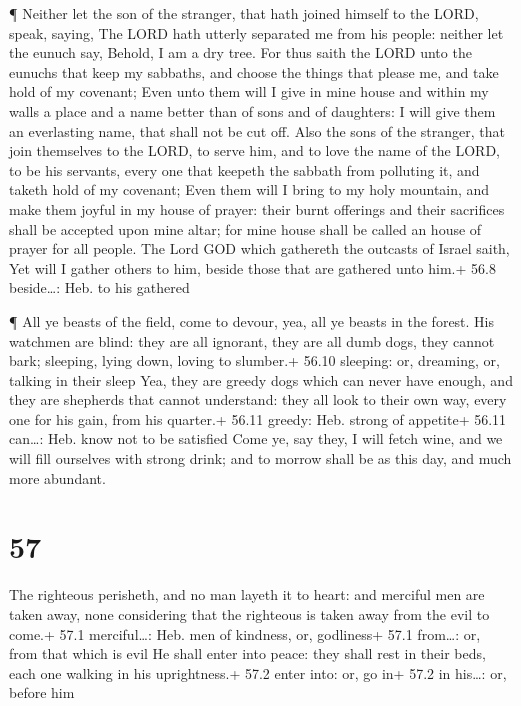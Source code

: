  ¶ Neither let the son of the stranger, that hath joined
himself to the LORD, speak, saying, The LORD hath utterly separated me
from his people: neither let the eunuch say, Behold, I am a dry tree.
 For thus saith the LORD unto the eunuchs that keep my
sabbaths, and choose the things that please me, and take hold of my
covenant;  Even unto them will I give in mine house and
within my walls a place and a name better than of sons and of daughters:
I will give them an everlasting name, that shall not be cut off.
 Also the sons of the stranger, that join themselves to the
LORD, to serve him, and to love the name of the LORD, to be his
servants, every one that keepeth the sabbath from polluting it, and
taketh hold of my covenant;  Even them will I bring to my
holy mountain, and make them joyful in my house of prayer: their burnt
offerings and their sacrifices shall be accepted upon mine altar; for
mine house shall be called an house of prayer for all people.
 The Lord GOD which gathereth the outcasts of Israel saith,
Yet will I gather others to him, beside those that are gathered unto
him.+ 56.8 beside\ldots: Heb. to his gathered

 ¶ All ye beasts of the field, come to devour, yea, all ye
beasts in the forest.  His watchmen are blind: they are all
ignorant, they are all dumb dogs, they cannot bark; sleeping, lying
down, loving to slumber.+ 56.10 sleeping: or, dreaming, or, talking in
their sleep  Yea, they are greedy dogs which can never have
enough, and they are shepherds that cannot understand: they all look to
their own way, every one for his gain, from his quarter.+ 56.11 greedy:
Heb. strong of appetite+ 56.11 can\ldots: Heb. know not to be satisfied
 Come ye, say they, I will fetch wine, and we will fill
ourselves with strong drink; and to morrow shall be as this day, and
much more abundant.

\hypertarget{section-56}{%
\section{57}\label{section-56}}

 The righteous perisheth, and no man layeth it to heart: and
merciful men are taken away, none considering that the righteous is
taken away from the evil to come.+ 57.1 merciful\ldots: Heb. men of
kindness, or, godliness+ 57.1 from\ldots: or, from that which is evil
 He shall enter into peace: they shall rest in their beds,
each one walking in his uprightness.+ 57.2 enter into: or, go in+ 57.2
in his\ldots: or, before him

